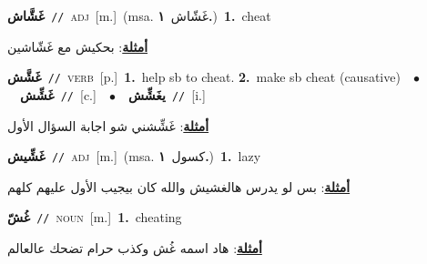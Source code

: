 \documentclass[10pt,a4paper,twoside]{article} %
\begin{document}
\begin{multicols}{2}
{\setlength\topsep{0pt}\textbf{\foreignlanguage{arabic}{غَشَّاش}}\ {\color{gray}\texttt{//}\color{black}}\ \textsc{adj}\ [m.]\ \color{gray}(msa. \foreignlanguage{arabic}{غَشّاش}~\foreignlanguage{arabic}{\textbf{١.}})\color{black}\ \textbf{1.}~cheat\  \begin{flushright}\color{gray}\foreignlanguage{arabic}{\textbf{\underline{\foreignlanguage{arabic}{أمثلة}}}: بحكيش مع غَشّاشين}\end{flushright}\color{black}} \vspace{2mm}

{\setlength\topsep{0pt}\textbf{\foreignlanguage{arabic}{غَشَّش}}\ {\color{gray}\texttt{//}\color{black}}\ \textsc{verb}\ [p.]\ \textbf{1.}~help sb to cheat.  \textbf{2.}~make sb cheat (causative)\ \ $\bullet$\ \ \setlength\topsep{0pt}\textbf{\foreignlanguage{arabic}{غَشِّش}}\ {\color{gray}\texttt{//}\color{black}}\ [c.]\ \ $\bullet$\ \ \setlength\topsep{0pt}\textbf{\foreignlanguage{arabic}{يغَشِّش}}\ {\color{gray}\texttt{//}\color{black}}\ [i.]\  \begin{flushright}\color{gray}\foreignlanguage{arabic}{\textbf{\underline{\foreignlanguage{arabic}{أمثلة}}}: غَشِّشني شو اجابة السؤال الأول}\end{flushright}\color{black}} \vspace{2mm}

{\setlength\topsep{0pt}\textbf{\foreignlanguage{arabic}{غَشِّيش}}\ {\color{gray}\texttt{//}\color{black}}\ \textsc{adj}\ [m.]\ \color{gray}(msa. \foreignlanguage{arabic}{كسول}~\foreignlanguage{arabic}{\textbf{١.}})\color{black}\ \textbf{1.}~lazy\  \begin{flushright}\color{gray}\foreignlanguage{arabic}{\textbf{\underline{\foreignlanguage{arabic}{أمثلة}}}: بس لو يدرس هالغشيش والله كان بيجيب الأول عليهم كلهم}\end{flushright}\color{black}} \vspace{2mm}

{\setlength\topsep{0pt}\textbf{\foreignlanguage{arabic}{غُشّ}}\ {\color{gray}\texttt{//}\color{black}}\ \textsc{noun}\ [m.]\ \textbf{1.}~cheating\  \begin{flushright}\color{gray}\foreignlanguage{arabic}{\textbf{\underline{\foreignlanguage{arabic}{أمثلة}}}: هاد اسمه غُش وكذب حرام تضحك عالعالم}\end{flushright}\color{black}} \vspace{2mm}


\end{multicols}
\end{document}
